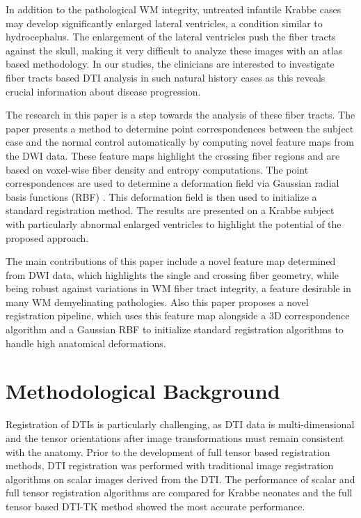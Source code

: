 \documentclass[]{spie}  %
\begin{document}
In addition to the pathological WM integrity, untreated infantile Krabbe cases may develop significantly enlarged lateral ventricles, a condition similar to hydrocephalus. The enlargement of the lateral ventricles push the fiber tracts against the skull, making it very difficult to analyze these images with an atlas based methodology. In our studies, the clinicians are interested to investigate fiber tracts based DTI analysis in such natural history cases as this reveals crucial information about disease progression.

The research in this paper is a step towards the analysis of these fiber tracts. The paper presents a method to determine point correspondences between the subject case and the normal control automatically by computing novel feature maps from the DWI data. These feature maps highlight the crossing fiber regions and are based on voxel-wise fiber density and entropy computations. The point correspondences are used to determine a deformation field via Gaussian radial basis functions (RBF) \cite{Mike99}. This deformation field  is then used to initialize a standard registration method. The results are presented on a Krabbe subject with particularly abnormal enlarged ventricles to highlight the potential of the proposed approach.

The main contributions of this paper include a novel feature map determined from DWI data, which highlights the single and crossing fiber geometry, while being robust against variations in WM fiber tract integrity, a feature desirable in many WM demyelinating pathologies. Also this paper proposes a novel registration pipeline, which uses this feature map alongside a 3D correspondence algorithm and a Gaussian RBF to initialize standard registration algorithms to handle high anatomical deformations.

\section{Methodological Background}
Registration of DTIs is particularly challenging, as DTI data is multi-dimensional and the tensor orientations after image transformations must remain consistent with the anatomy. Prior to the development of full tensor based registration methods, DTI registration was performed with traditional image registration algorithms on scalar images derived from the DTI. The performance of scalar and full tensor registration algorithms are compared for Krabbe neonates \cite{Wang11} and the full tensor based DTI-TK \cite{Zhang06} method showed the most accurate performance. %
\end{document}
